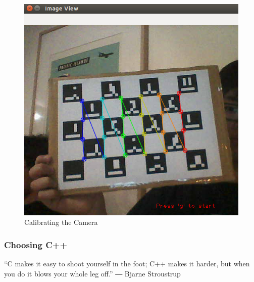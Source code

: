 \documentclass[11pt]{article}
\begin{document}
\begin{figure}
	\centering
	\includegraphics[scale=0.5]{pics/calibration.jpg}
	\caption{Calibrating the Camera}
	\label{cameraCalibration}
\end{figure}

\subsubsection{Choosing C++}
\begin{center}
“C makes it easy to shoot yourself in the foot; C++ makes it harder, but when you do it blows your whole leg off.”
― Bjarne Stroustrup
\end{center}
\end{document}
